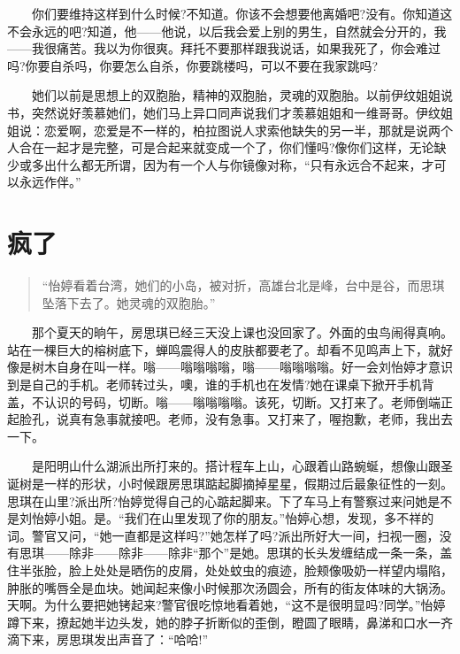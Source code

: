 \documentclass[12pt,UTF8]{ctexbook}
\begin{document}
　　你们要维持这样到什么时候?不知道。你该不会想要他离婚吧?没有。你知道这不会永远的吧?知道，他------他说，以后我会爱上别的男生，自然就会分开的，我------我很痛苦。我以为你很爽。拜托不要那样跟我说话，如果我死了，你会难过吗?你要自杀吗，你要怎么自杀，你要跳楼吗，可以不要在我家跳吗?

　　她们以前是思想上的双胞胎，精神的双胞胎，灵魂的双胞胎。以前伊纹姐姐说书，突然说好羡慕她们，她们马上异口同声说我们才羡慕姐姐和一维哥哥。伊纹姐姐说：恋爱啊，恋爱是不一样的，柏拉图说人求索他缺失的另一半，那就是说两个人合在一起才是完整，可是合起来就变成一个了，你们懂吗?像你们这样，无论缺少或多出什么都无所谓，因为有一个人与你镜像对称，\enquote{只有永远合不起来，才可以永远作伴。}

\hypertarget{ux75afux4e86}{%
\section*{疯了}\label{ux75afux4e86}}

\begin{quote}
\enquote{怡婷看着台湾，她们的小岛，被对折，高雄台北是峰，台中是谷，而思琪坠落下去了。她灵魂的双胞胎。}
\end{quote}

　　那个夏天的晌午，房思琪已经三天没上课也没回家了。外面的虫鸟闹得真响。站在一棵巨大的榕树底下，蝉鸣震得人的皮肤都要老了。却看不见鸣声上下，就好像是树木自身在叫一样。嗡------嗡嗡嗡嗡，嗡------嗡嗡嗡嗡。好一会刘怡婷才意识到是自己的手机。老师转过头，噢，谁的手机也在发情?她在课桌下掀开手机背盖，不认识的号码，切断。嗡------嗡嗡嗡嗡。该死，切断。又打来了。老师倒端正起脸孔，说真有急事就接吧。老师，没有急事。又打来了，喔抱歉，老师，我出去一下。

　　是阳明山什么湖派出所打来的。搭计程车上山，心跟着山路蜿蜒，想像山跟圣诞树是一样的形状，小时候跟房思琪踮起脚摘掉星星，假期过后最象征性的一刻。思琪在山里?派出所?怡婷觉得自己的心踮起脚来。下了车马上有警察过来问她是不是刘怡婷小姐。是。\enquote{我们在山里发现了你的朋友。}怡婷心想，发现，多不祥的词。警官又问，\enquote{她一直都是这样吗?}她怎样了吗?派出所好大一间，扫视一圈，没有思琪------除非------除非------除非\enquote{那个}是她。思琪的长头发缠结成一条一条，盖住半张脸，脸上处处是晒伤的皮屑，处处蚊虫的痕迹，脸颊像吸奶一样望内塌陷，肿胀的嘴唇全是血块。她闻起来像小时候那次汤圆会，所有的街友体味的大锅汤。天啊。为什么要把她铐起来?警官很吃惊地看着她，\enquote{这不是很明显吗?同学。}怡婷蹲下来，撩起她半边头发，她的脖子折断似的歪倒，瞪圆了眼睛，鼻涕和口水一齐滴下来，房思琪发出声音了：\enquote{哈哈!}
\end{document}
